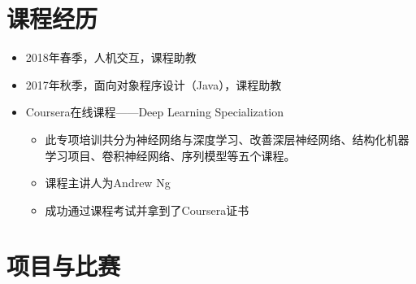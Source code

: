 \documentclass[letterpaper]{twentysecondcv} %
\begin{document}
\begin{CJK*}{UTF8}{gbsn}

\section{课程经历}

\begin{itemize}
	\item 2018年春季，人机交互，课程助教
	\item 2017年秋季，面向对象程序设计（Java），课程助教
	\item Coursera在线课程——Deep Learning Specialization
		\begin{itemize}
			\item 此专项培训共分为神经网络与深度学习、改善深层神经网络、结构化机器学习项目、卷积神经网络、序列模型等五个课程。
			\item 课程主讲人为Andrew Ng
			\item 成功通过课程考试并拿到了Coursera证书
		\end{itemize}
\end{itemize}


\section{项目与比赛}


\end{CJK*}
\end{document}
